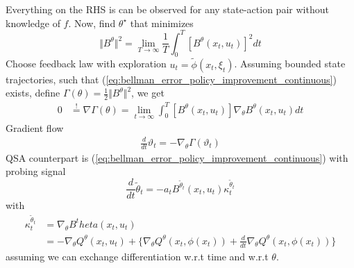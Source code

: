 Everything on the RHS is can be observed for any state-action pair without knowledge of \(f\).
Now, find \(\theta^\star\) that minimizes
\[\Vert B^\theta\Vert^2=\lim_{T\to\infty}\frac{1}{T}\int_0^T[B^\theta(x_t,u_t)]^2dt\]
Choose feedback law with exploration \(u_t=\tilde{\phi}(x_t,\xi_t)\). Assuming
bounded state trajectories, such that (\ref{eq:bellman_error_policy_improvement_continuous}) exists,
define \(\Gamma(\theta)=\frac{1}{2}\Vert B^\theta\Vert^2\), we get 
\begin{align*}
    0&\stackrel{!}{=}\nabla\Gamma(\theta)=\lim_{t\to\infty}\int_0^T\left[B^\theta(x_t,u_t)\right]\nabla_\theta B^\theta(x_t,u_t)dt
\end{align*}
Gradient flow 
\begin{align*}
    \frac{d}{dt}\vartheta_t=-\nabla_\theta\Gamma(\vartheta_t)
\end{align*}
QSA counterpart is (\ref{eq:bellman_error_policy_improvement_continuous})
with probing signal 
\[\frac{d}{dt}\tilde{\theta}_t=-a_tB^{\tilde{\theta}_t}(x_t,u_t)\kappa_t^{\tilde{\theta}_t}\]
with 
\begin{align*}
    \kappa_t^{\tilde{\theta}_t}&=\nabla_\theta B^theta(x_t,u_t)\\
    &=-\nabla_\theta Q^\theta(x_t,u_t)+\{\nabla_\theta Q^\theta(x_t,\phi(x_t))+ \frac{d}{dt}\nabla_\theta Q^\theta(x_t,\phi(x_t))\}
\end{align*}
assuming we can exchange differentiation w.r.t time and w.r.t \(\theta\).

